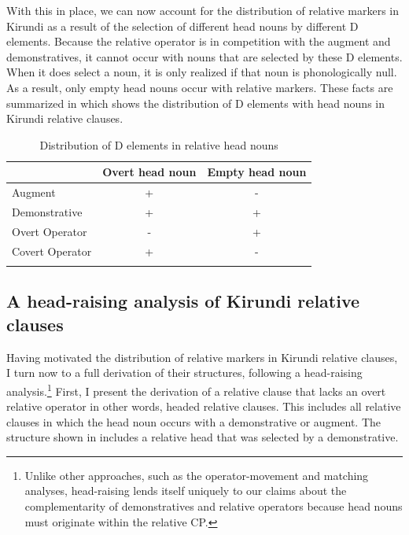 \documentclass[output=paper,colorlinks,citecolor=brown
]{langscibook}
\begin{document}
With this in place, we can now account for the distribution of relative markers in Kirundi as a result of the selection of different head nouns by different D elements. Because the relative operator is in competition with the augment and demonstratives, it cannot occur with nouns that are selected by these D elements. When it does select a noun, it is only realized if that noun is phonologically null. As a result, only empty head nouns occur with relative markers. These facts are summarized in  which shows the distribution of D elements with head nouns in Kirundi relative clauses.

\begin{table} 
\caption{Distribution of D elements in relative head nouns} \label{tab:myers:nouns}
 \begin{tabular}{lcc}
  \lsptoprule
& Overt head noun & Empty head noun\\
  \midrule
  Augment &  + & \cellcolor{lightgray} - \\
  Demonstrative & +  & + \\ 
  Overt Operator & \cellcolor{lightgray} -  & + \\
  Covert Operator & +  & \cellcolor{lightgray} - \\
  \lspbottomrule
 \end{tabular}
\end{table}



\subsection{A head-raising analysis of Kirundi relative clauses} \label{sec:myers:headraising}
Having motivated the distribution of relative markers in Kirundi relative clauses, I turn now to a full derivation of their structures, following a head-raising analysis.\footnote{Unlike other approaches, such as the operator-movement and matching analyses, head-raising lends itself uniquely to our claims about the complementarity of demonstratives and relative operators because head nouns must originate within the relative CP.} First, I present the derivation of a relative clause that lacks an overt relative operator \textendash{} in other words, headed relative clauses. This includes all relative clauses in which the head noun occurs with a demonstrative or augment. The structure shown in  includes a relative head that was selected by a demonstrative.
\end{document}
